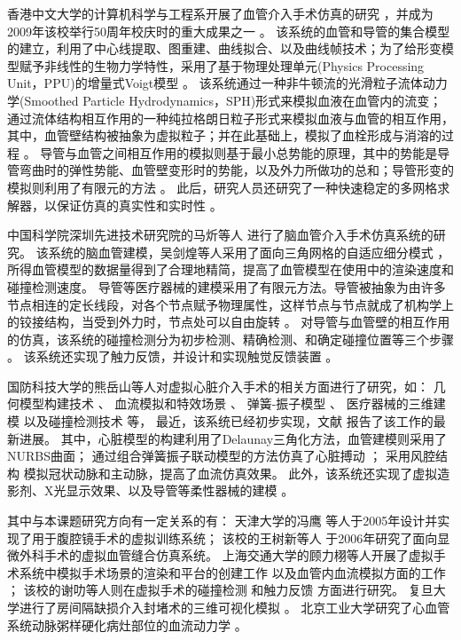 香港中文大学的计算机科学与工程系开展了血管介入手术仿真的研究 \cite{guo2007CUHK,Chui2010CUHK,Li2011CUHK,Li2012CUHK}，并成为2009年该校举行50周年校庆时的重大成果之一 \cite{cuhkweb}。%
该系统的血管和导管的集合模型的建立，利用了中心线提取、图重建、曲线拟合、以及曲线帧技术；为了给形变模型赋予非线性的生物力学特性，采用了基于物理处理单元(Physics Processing Unit，PPU)的增量式Voigt模型 \cite{guo2007CUHK}。%
该系统通过一种非牛顿流的光滑粒子流体动力学(Smoothed Particle Hydrodynamics，SPH)形式来模拟血液在血管内的流变；通过流体结构相互作用的一种纯拉格朗日粒子形式来模拟血液与血管的相互作用，其中，血管壁结构被抽象为虚拟粒子；并在此基础上，模拟了血栓形成与消溶的过程 \cite{Chui2010CUHK}。%
导管与血管之间相互作用的模拟则基于最小总势能的原理，其中的势能是导管弯曲时的弹性势能、血管壁变形时的势能，以及外力所做功的总和；导管形变的模拟则利用了有限元的方法 \cite{Li2011CUHK}。%
此后，研究人员还研究了一种快速稳定的多网格求解器，以保证仿真的真实性和实时性 \cite{Li2012CUHK}。

中国科学院深圳先进技术研究院的马炘等人 \cite{Ma2010SIAT,Ma2010aSIAT}进行了脑血管介入手术仿真系统的研究。
该系统的脑血管建模，吴剑煌等人采用了面向三角网格的自适应细分模式 \cite{Ma2010bSIAT,Wu2006SIAT}，所得血管模型的数据量得到了合理地精简，提高了血管模型在使用中的渲染速度和碰撞检测速度。%
导管等医疗器械的建模采用了有限元方法。导管被抽象为由许多节点相连的定长线段，对各个节点赋予物理属性，这样节点与节点就成了机构学上的铰接结构，当受到外力时，节点处可以自由旋转 \cite{Ma2010SIAT}。%
对导管与血管壁的相互作用的仿真，该系统的碰撞检测分为初步检测、精确检测、和确定碰撞位置等三个步骤 \cite{Ma2010SIAT}。
该系统还实现了触力反馈，并设计和实现触觉反馈装置 \cite{Ma2010SIAT}。

国防科技大学的熊岳山等人对虚拟心脏介入手术的相关方面进行了研究，如：
几何模型构建技术 \cite{han2005master}、
血流模拟和特效场景 \cite{ren2005master,Ren2006NUDT}、
弹簧-振子模型 \cite{wang2006master,Wang2008NUDT}、
医疗器械的三维建模 \cite{zhu2007master}
以及碰撞检测技术 \cite{kang2007master}等，
最近，该系统已经初步实现，文献 \cite{Tan2012NUDT}报告了该工作的最新进展。
其中，心脏模型的构建利用了Delaunay三角化方法，血管建模则采用了NURBS曲面；
通过组合弹簧振子联动模型的方法仿真了心脏搏动 \cite{Wang2008NUDT}；
采用风腔结构 \cite{Ren2006NUDT}模拟冠状动脉和主动脉，提高了血流仿真效果。
此外，该系统还实现了虚拟造影剂、X光显示效果、以及导管等柔性器械的建模 \cite{Tan2012NUDT}。

其中与本课题研究方向有一定关系的有：
天津大学的冯鹰 \cite{li2005master}等人于2005年设计并实现了用于腹腔镜手术的虚拟训练系统；
该校的王树新等人 \cite{zeng2006master}于2006年研究了面向显微外科手术的虚拟血管缝合仿真系统。
上海交通大学的顾力栩等人开展了虚拟手术系统中模拟手术场景的渲染和平台的创建工作 \cite{zheng2008master}以及血管内血流模拟方面的工作 \cite{huang2011virtual}；
该校的谢叻等人则在虚拟手术的碰撞检测 \cite{wu2010virtual}和触力反馈 \cite{wu2011virtual}方面进行研究。
复旦大学进行了房间隔缺损介入封堵术的三维可视化模拟 \cite{Zhao2006Fudan}。
北京工业大学研究了心血管系统动脉粥样硬化病灶部位的血流动力学 \cite{Huang2003BJUT}。

